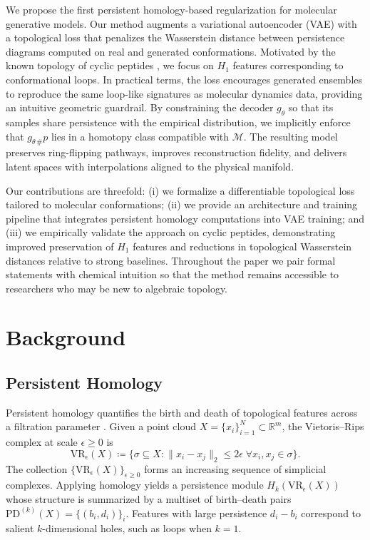 \documentclass[11pt]{article}
\theoremstyle{definition}
\begin{document}
We propose the first persistent homology-based regularization for molecular generative models. Our method augments a variational autoencoder (VAE) with a topological loss that penalizes the Wasserstein distance between persistence diagrams computed on real and generated conformations. Motivated by the known topology of cyclic peptides \cite{wales2001microscopic, shaw2010atomic}, we focus on $H_1$ features corresponding to conformational loops. In practical terms, the loss encourages generated ensembles to reproduce the same loop-like signatures as molecular dynamics data, providing an intuitive geometric guardrail. By constraining the decoder $g_\theta$ so that its samples share persistence with the empirical distribution, we implicitly enforce that $g_{\theta\,\#}p$ lies in a homotopy class compatible with $\mathcal{M}$. The resulting model preserves ring-flipping pathways, improves reconstruction fidelity, and delivers latent spaces with interpolations aligned to the physical manifold.

Our contributions are threefold: (i) we formalize a differentiable topological loss tailored to molecular conformations; (ii) we provide an architecture and training pipeline that integrates persistent homology computations into VAE training; and (iii) we empirically validate the approach on cyclic peptides, demonstrating improved preservation of $H_1$ features and reductions in topological Wasserstein distances relative to strong baselines. Throughout the paper we pair formal statements with chemical intuition so that the method remains accessible to researchers who may be new to algebraic topology.

\section{Background}
\subsection{Persistent Homology}
Persistent homology quantifies the birth and death of topological features across a filtration parameter \cite{edelsbrunner2010computational, carlsson2009topology}. Given a point cloud $X = \{x_i\}_{i=1}^N \subset \mathbb{R}^m$, the Vietoris--Rips complex at scale $\epsilon \geq 0$ is
\begin{equation}
    \mathrm{VR}_\epsilon(X) \coloneqq \big\{ \sigma \subseteq X : \|x_i - x_j\|_2 \leq 2\epsilon \; \forall x_i, x_j \in \sigma \big\}.
    \label{eq:vietoris-rips}
\end{equation}
The collection $\big\{ \mathrm{VR}_\epsilon(X) \big\}_{\epsilon \geq 0}$ forms an increasing sequence of simplicial complexes. Applying homology yields a persistence module $H_k(\mathrm{VR}_\epsilon(X))$ whose structure is summarized by a multiset of birth--death pairs $\mathrm{PD}^{(k)}(X) = \{(b_i, d_i)\}_{i}$. Features with large persistence $d_i - b_i$ correspond to salient $k$-dimensional holes, such as loops when $k=1$.
\end{document}
